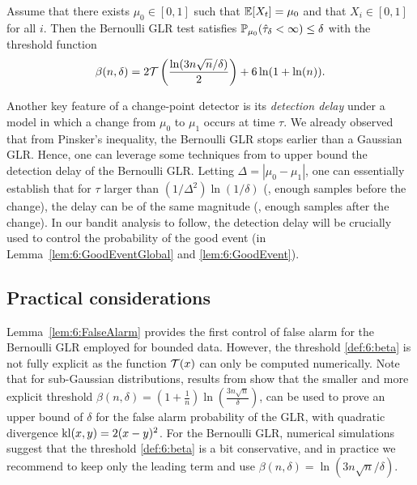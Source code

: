 \begin{lemma}\label{lem:6:FalseAlarm}
    Assume that there exists $\mu_0 \in [0,1]$ such that $\mathbb{E}[X_t] = \mu_0$ and that $X_i \in [0,1]$ for all $i$. Then the Bernoulli GLR test satisfies $\mathbb{P}_{\mu_0}(\hat\tau_\delta < \infty) \leq \delta$ with the threshold function
    \begin{equation}\label{def:6:beta}
        \beta(n,\delta)= 2\mathcal{T}\left(\frac{\ln(3n\sqrt{n}/\delta)}{2}\right) + 6\ln(1+\ln(n)).
    \end{equation}
\end{lemma}

Another key feature of a change-point detector is its \emph{detection delay} under a model in which a change from $\mu_0$ to $\mu_1$ occurs at time $\tau$. We already observed that from Pinsker's inequality, the Bernoulli GLR stops earlier than a Gaussian GLR. Hence, one can leverage some techniques from \cite{Maillard2018GLR} to upper bound the detection delay of the Bernoulli GLR. Letting $\Delta = |\mu_0 - \mu_1|$, one can essentially establish that for $\tau$ larger than $(1/\Delta^2)\ln(1/\delta)$ (\ie, enough samples before the change), the delay can be of the same magnitude (\ie, enough samples after the change). In our bandit analysis to follow, the detection delay will be crucially used to control the probability of the good event (in Lemma~\ref{lem:6:GoodEventGlobal} and \ref{lem:6:GoodEvent}).

\subsection{Practical considerations}\label{sub:6:PracticalConsiderations}

Lemma~\ref{lem:6:FalseAlarm} provides the first control of false alarm for the Bernoulli GLR employed for bounded data. However, the threshold \eqref{def:6:beta} is not fully explicit as the function $\mathcal{T}(x)$ can only be computed numerically.
Note that for sub-Gaussian distributions, results from \cite{Maillard2018GLR} show that the smaller and more explicit threshold
$\beta(n,\delta) = \left(1 + \frac{1}{n}\right)\ln\left(\frac{3n\sqrt{n}}{\delta}\right)$,
can be used to prove an upper bound of $\delta$ for the false alarm probability of the GLR, with quadratic divergence $\mathrm{kl}(x,y)=2(x-y)^2$.
%
For the Bernoulli GLR, numerical simulations suggest that the threshold \eqref{def:6:beta} is a bit conservative, and in practice we recommend to keep only the leading term and use $\beta(n,\delta) = \ln(3n\sqrt{n}/\delta)$.

